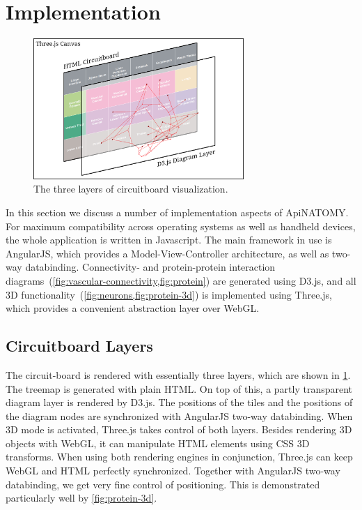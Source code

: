 \section{Implementation} \label{sect:implementation}                                     %

\begin{figure}
	\centering
	\includegraphics[width=8cm]{images/visual-layers.png}
	\caption{The three layers of circuitboard visualization.}
	\label{fig:visual-layers}
\end{figure}

In this section we discuss a number of implementation aspects of \mbox{ApiNATOMY}.
For maximum compatibility across operating systems as well as handheld devices,
the whole application is written in Javascript. The main framework in use is
AngularJS, which provides a Model-View-Controller architecture, as well as
two-way databinding. Connectivity- and protein-protein
interaction diagrams~(\cref{fig:vascular-connectivity,fig:protein})
are generated using D3.js, and all 3D functionality~(\cref{fig:neurons,fig:protein-3d})
is implemented using Three.js, which provides a convenient abstraction layer over WebGL.


\subsection{Circuitboard Layers} %

The circuit-board is rendered with essentially three layers,
which are shown in \cref{fig:visual-layers}. The treemap is generated
with plain HTML. On top of this, a partly transparent diagram layer is
rendered by D3.js. The positions of the tiles and the positions of the
diagram nodes are synchronized with AngularJS two-way databinding.
When 3D mode is activated, Three.js takes control of both layers.
Besides rendering 3D objects with WebGL, it can manipulate HTML
elements using CSS 3D transforms. When using both rendering engines
in conjunction, Three.js can keep WebGL and HTML perfectly synchronized.
Together with AngularJS two-way databinding, we get very fine control
of positioning. This is demonstrated particularly well by \cref{fig:protein-3d}.


